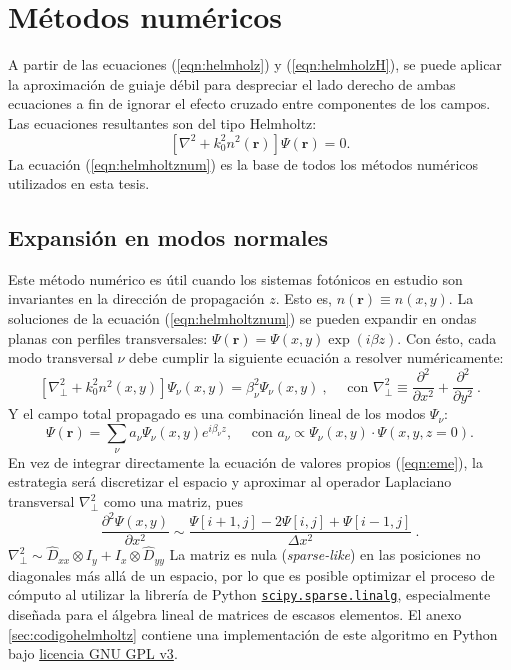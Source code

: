 \chapter{Métodos numéricos}
A partir de las ecuaciones (\ref{eqn:helmholz}) y (\ref{eqn:helmholzH}), se puede aplicar la aproximación de guiaje débil para despreciar el lado derecho de ambas ecuaciones a fin de ignorar el efecto cruzado entre componentes de los campos. Las ecuaciones resultantes son del tipo Helmholtz:
\begin{equation}
	\left[\nabla^2 + k_0^2 n^2(\textbf{r})\right]\Psi(\textbf{r}) = 0. \label{eqn:helmholtznum}
\end{equation}
La ecuación (\ref{eqn:helmholtznum}) es la base de todos los métodos numéricos utilizados en esta tesis.
\section{Expansión en modos normales \label{cap:eme}}
Este método numérico es útil cuando los sistemas fotónicos en estudio son invariantes en la dirección de propagación $z$. Esto es, $n(\textbf{r})\equiv n(x,y)$. La soluciones de la ecuación (\ref{eqn:helmholtznum}) se pueden expandir en ondas planas con perfiles transversales: $\Psi(\textbf{r}) = \Psi(x,y) \exp({i\beta z})$. Con ésto, cada modo transversal $\nu$ debe cumplir la siguiente ecuación a resolver numéricamente:
\begin{equation}
	\left[\nabla_\perp^2 + k_0^2 n^2(x,y)\right]\Psi_\nu(x,y) = \beta_\nu^2\Psi_\nu(x,y) \ , \quad\text{ con } \nabla_\perp^2 \equiv \frac{\partial^2}{\partial x^2} + \frac{\partial^2}{\partial y^2} \ .
	\label{eqn:eme}
\end{equation}
Y el campo total propagado es una combinación lineal de los modos $\Psi_\nu$: 
\begin{equation}
	\Psi(\textbf{r}) = \sum_\nu a_\nu \Psi_\nu(x,y) e^{i\beta_\nu z}, \quad\text{ con } a_\nu \propto \Psi_\nu(x,y) \cdot \Psi(x, y, z=0).
\end{equation}
En vez de integrar directamente la ecuación de valores propios (\ref{eqn:eme}), la estrategia será discretizar el espacio y aproximar al operador Laplaciano transversal $\nabla_\perp^2$ como una matriz, pues $$\frac{\partial^2 \Psi(x,y)}{\partial x^2} \sim \frac{\Psi[i+1,j]-2\Psi[i,j]+\Psi[i-1,j]}{\Delta x ^2}  \ .
$$
$\nabla^2_\perp \sim \hat{D}_{xx} \otimes I_y + I_x \otimes \hat{D}_{yy}$
La matriz es nula (\textit{sparse-like}) en las posiciones no diagonales más allá de un espacio, por lo que es posible optimizar el proceso de cómputo al utilizar la librería de Python \href{https://docs.scipy.org/doc/scipy/reference/sparse.linalg.html}{\color{magenta}\texttt{scipy.sparse.linalg}}, especialmente diseñada para el álgebra lineal de matrices de escasos elementos. El anexo \ref{sec:codigohelmholtz} contiene una implementación de este algoritmo en Python bajo \href{https://www.gnu.org/licenses/gpl-3.0.html}{\color{magenta}licencia GNU GPL v3}.

